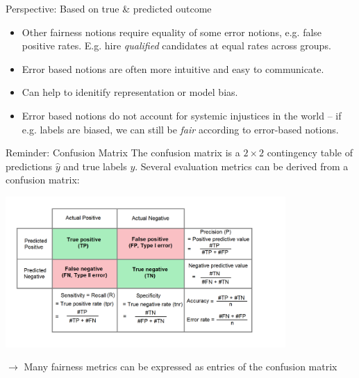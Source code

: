 \documentclass[11pt,compress,t,notes=noshow, xcolor=table]{beamer}
\begin{document}
\begin{vbframe}{Perspective: Based on true \& predicted outcome}
    \textbf{}
    \begin{itemize}
        \item Other fairness notions require equality of some error notions, e.g. false positive rates. E.g. hire \emph{qualified} candidates at equal rates across groups.
        \vspace{10pt}
        
        \item Error based notions are often more intuitive and easy to communicate.
        \vspace{10pt}
        
        \item Can help to idenitify representation or model bias.
        \vspace{10pt}
        
        \item Error based notions do not account for systemic injustices in the world -- if e.g. labels are biased, we can still be \emph{fair} according to error-based notions. 
    \end{itemize}
\end{vbframe}

\begin{vbframe}{Reminder: Confusion Matrix}
    The confusion matrix is a $2 \times 2$ contingency table of predictions $\hat{y}$ and true labels $y$.
    Several evaluation metrics can be derived from a confusion matrix:
    \vfill
    \begin{center}
        \includegraphics[width=0.8\textwidth]{figures/roc-confusion_matrix.png}
    \end{center}
    $\rightarrow$ Many fairness metrics can be expressed as entries of the confusion matrix
\end{vbframe}
   
\end{document}
